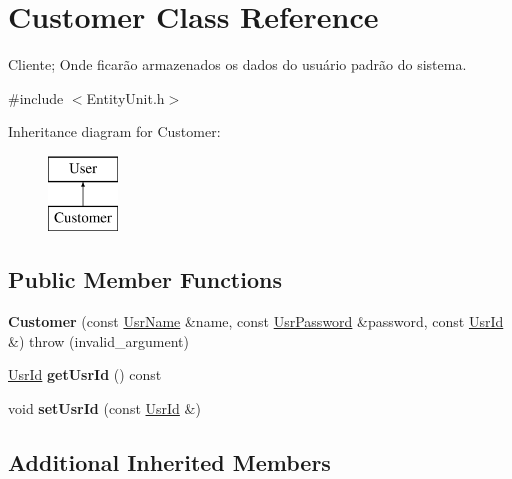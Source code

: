 \hypertarget{classCustomer}{\section{Customer Class Reference}
\label{classCustomer}
}


Cliente; Onde ficarão armazenados os dados do usuário padrão do sistema.  




{\ttfamily \#include $<$Entity\-Unit.\-h$>$}

Inheritance diagram for Customer\-:\begin{figure}[H]
\begin{center}
\leavevmode
\includegraphics[height=2.000000cm]{classCustomer}
\end{center}
\end{figure}
\subsection*{Public Member Functions}
\begin{DoxyCompactItemize}
\item 
\hypertarget{classCustomer_aeef5b5cf9de00a37f6db9d58bff82bf8}{{\bfseries Customer} (const \hyperlink{classUsrName}{Usr\-Name} \&name, const \hyperlink{classUsrPassword}{Usr\-Password} \&password, const \hyperlink{classUsrId}{Usr\-Id} \&)  throw (invalid\-\_\-argument)}\label{classCustomer_aeef5b5cf9de00a37f6db9d58bff82bf8}

\item 
\hypertarget{classCustomer_a76d325591ef27599cb1d7f3e4b77b8d4}{\hyperlink{classUsrId}{Usr\-Id} {\bfseries get\-Usr\-Id} () const }\label{classCustomer_a76d325591ef27599cb1d7f3e4b77b8d4}

\item 
\hypertarget{classCustomer_a89b74269a4750193d61b305b13df82fa}{void {\bfseries set\-Usr\-Id} (const \hyperlink{classUsrId}{Usr\-Id} \&)}\label{classCustomer_a89b74269a4750193d61b305b13df82fa}

\end{DoxyCompactItemize}
\subsection*{Additional Inherited Members}


